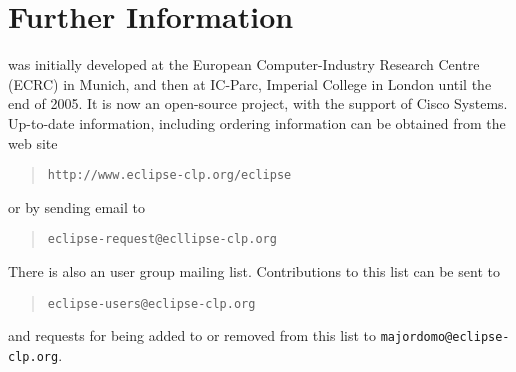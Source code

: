 
\section{Further Information}
{\eclipse} was initially developed at the European Computer-Industry
Research Centre (ECRC) in Munich, and then at IC-Parc, Imperial College in London
until the end of 2005. It is now an open-source project, with the
support of Cisco Systems.
Up-to-date information, including ordering information can be obtained from
the {\eclipse} web site
\begin{quote}\begin{verbatim}
http://www.eclipse-clp.org/eclipse
\end{verbatim}\end{quote}
or by sending email to
\begin{quote}\begin{verbatim}
eclipse-request@ecllipse-clp.org
\end{verbatim}\end{quote}
There is also an {\eclipse} user group mailing list.
Contributions to this list can be sent to
\begin{quote}\begin{verbatim}
eclipse-users@eclipse-clp.org
\end{verbatim}\end{quote}
and requests for being added to or removed from this list to
{\tt majordomo@eclipse-clp.org}.

